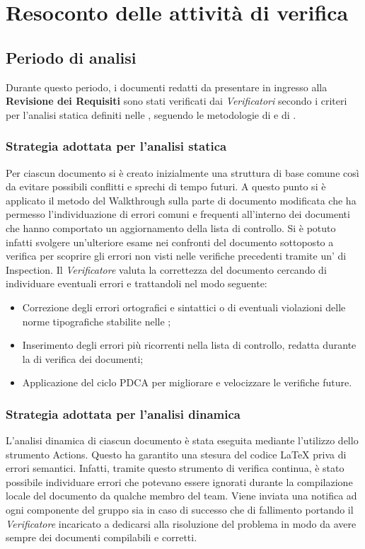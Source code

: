 \section{Resoconto delle attività di verifica}
\label{resoconto}
\subsection{Periodo di analisi}
Durante questo periodo, i documenti redatti da presentare in ingresso alla \textbf{Revisione dei Requisiti} sono stati verificati dai \textit{Verificatori} secondo i criteri per l'analisi statica definiti nelle , seguendo le metodologie di  e di .
\subsubsection{Strategia adottata per l'analisi statica}
Per ciascun documento si è creato inizialmente una struttura di base comune così da evitare possibili conflitti e sprechi di tempo futuri. A questo punto si è applicato il metodo del Walkthrough sulla parte di documento modificata che ha permesso l'individuazione di errori comuni e frequenti all'interno dei documenti che hanno comportato un aggiornamento della lista di controllo. Si è potuto infatti svolgere un’ulteriore esame nei confronti del documento sottoposto a verifica per scoprire gli errori non visti nelle verifiche precedenti tramite un' di Inspection. Il \textit{Verificatore} valuta la correttezza del documento cercando di individuare eventuali errori e trattandoli nel modo seguente:
	\begin{itemize}
		\item Correzione degli errori ortografici e sintattici o di eventuali violazioni delle norme tipografiche stabilite nelle ;
		\item Inserimento degli errori più ricorrenti nella lista di controllo, redatta durante la  di verifica dei documenti;
		\item Applicazione del ciclo PDCA per migliorare e velocizzare le verifiche future.
	\end{itemize}
\subsubsection{Strategia adottata per l'analisi dinamica}
L'analisi dinamica di ciascun documento è stata eseguita mediante l'utilizzo dello strumento  Actions. Questo ha garantito una stesura del codice \LaTeX{} priva di errori semantici. Infatti, tramite questo strumento di verifica continua, è stato possibile individuare errori che potevano essere ignorati durante la compilazione locale del documento da qualche membro del team. Viene inviata una notifica ad ogni componente del gruppo sia in caso di successo che di fallimento portando il \textit{Verificatore} incaricato a dedicarsi alla risoluzione del problema in modo da avere sempre dei documenti compilabili e corretti.
